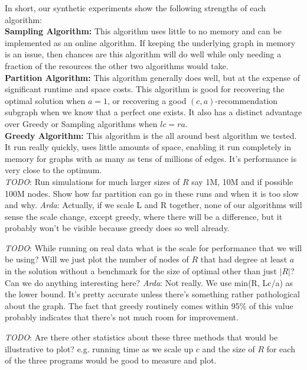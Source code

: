 \vs
In short, our synthetic experiments show the following strengths of each algorithm:\\
\textbf{Sampling Algorithm:} This algorithm uses little to no memory and can be implemented as an online algorithm. If keeping the underlying graph in memory is an issue, then chances are this algorithm will do well while only needing a fraction of the resources the other two algorithms would take.\\
\textbf{Partition Algorithm:} This algorithm generally does well, but at the expense of significant runtime and space costs. This algorithm is good for recovering the optimal solution when $a=1$, or recovering a good $(c,a)$-recommendation subgraph when we know that a perfect one exists. It also has a distinct advantage over Greedy or Sampling algorithms when $lc=ra$.\\
\textbf{Greedy Algorithm:} This algorithm is the all around best algorithm we tested. It run really quickly, uses little amounts of space, enabling it run completely in memory for graphs with as many as tens of millions of edges. It's performance is very close to the optimum. \\

\emph{TODO}: Run simulations for much larger sizes of $R$ say 1M, 10M and if possible 100M nodes. Show how far partition can go in these runs and when it is too slow and why.
\emph{Arda}: Actually, if we scale L and R together, none of our algorithms will sense the scale change, except greedy, where there will be a difference, but it probably won't be visible because greedy does so well already.

\emph{TODO}: While running on real data what is the scale for performance that we will be using? Will we just plot the number of nodes of $R$ that had degree at least $a$ in the solution without a benchmark for the size of optimal other than just $|R|$? Can we do anything interesting here?
\emph{Arda}: Not really. We use min(R, Lc/a) as the lower bound. It's pretty accurate unless there's something rather pathological about the graph. The fact that greedy routinely comes within 95\% of this value probably indicates that there's not much room for improvement.

\emph{TODO}: Are there other statistics about these three methods that would be illustrative to plot? e.g. running time as we scale up $c$ and the size of $R$ for each of the three programs would be good to measure and plot.